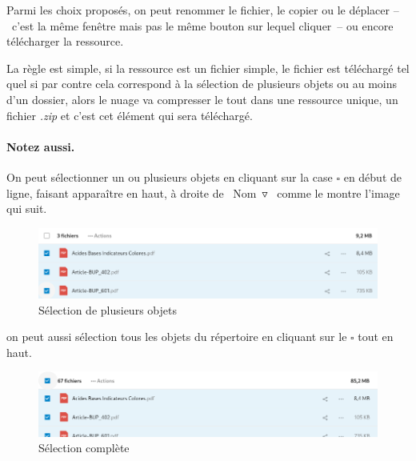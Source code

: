 Parmi les choix proposés, on peut renommer le fichier, le copier ou le déplacer --~c'est la même fenêtre mais pas le même bouton sur lequel cliquer~-- ou encore télécharger la ressource.

La règle est simple, si la ressource est un fichier simple, le fichier est téléchargé tel quel si par contre cela correspond à la sélection de plusieurs objets ou au moins d'un dossier, alors le nuage va compresser le tout dans une ressource unique, un fichier \emph{.zip} et c'est cet élément qui sera téléchargé.

\paragraph{Notez aussi.} 
On peut sélectionner un ou plusieurs objets en cliquant sur la case $\square$ en début de ligne, faisant apparaître en haut, à droite de \og~Nom~$\triangledown$~\fg{} comme le montre l'image qui suit.
\begin{figure}
	\centering
	\includegraphics{./Captures/nuage.selection.plusieurs.objets.png}
	\caption{Sélection de plusieurs objets}
\end{figure}
on peut aussi sélection tous les objets du répertoire en cliquant sur le $\square$ tout en haut.
\begin{figure}
	\centering
	\includegraphics{./Captures/nuage.selection.tous.objets.png}
	\caption{Sélection complète}
\end{figure}